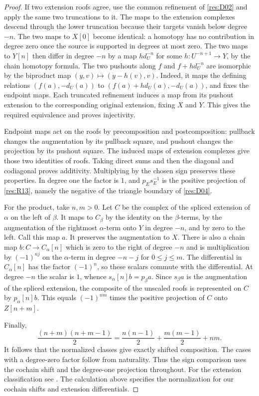\begin{proof}
If two extension roofs agree, use the common refinement of
\ref{res:D02} and apply the same two truncations to it.
The maps to the extension complexes descend through the lower
truncation because their targets vanish below degree \(-n\).
The two maps to \(X[0]\) become identical: a homotopy has no contribution
in degree zero once the source is supported in degrees at most
zero. The two maps to \(Y[n]\) then differ in degree \(-n\) by a
map \(h d_U^{-n}\) for some \(h:U^{-n+1}\to Y\), by the chain
homotopy formula. The two pushouts along \(f\) and \(f+h d_U^{-n}\)
are isomorphic by the biproduct map
\((y,v)\mapsto(y-h(v),v)\). Indeed, it maps the defining relations
\((f(a),-d_U(a))\) to \((f(a)+h d_U(a),-d_U(a))\), and fixes
the endpoint maps. Each truncated refinement induces a map
from its pushout extension to the corresponding original
extension, fixing \(X\) and \(Y\). This gives the required
equivalence and proves injectivity.

Endpoint maps act on the roofs by precomposition and postcomposition:
pullback changes the augmentation by its pullback square, and
pushout changes the projection by its pushout square. The induced
maps of extension complexes give those two identities of roofs.
Taking direct sums and then the diagonal and codiagonal proves
additivity. Multiplying by the chosen sign preserves these
properties. In degree one the factor is \(1\), and \(p_Es_E^{-1}\)
is the positive projection of \ref{res:R13}, namely the negative
of the triangle boundary of \ref{res:D04}.

For the product, take \(n,m>0\). Let \(C\) be the complex of the
spliced extension of \(\alpha\) on the left of \(\beta\).
It maps to \(C_\beta\) by the identity on the \(\beta\)-terms,
by the augmentation of the rightmost \(\alpha\)-term onto \(Y\)
in degree \(-n\), and by zero to the left. Call this map \(a\).
It preserves the augmentation to \(X\). There is also a chain
map \(b:C\to C_\alpha[n]\) which is zero to the right of
degree \(-n\) and is multiplication by \((-1)^{nj}\) on the
\(\alpha\)-term in degree \(-n-j\) for \(0\le j\le m\).
The differential in \(C_\alpha[n]\) has the factor \((-1)^n\),
so these scalars commute with the differential. At degree \(-n\)
the scalar is \(1\), whence \(s_\alpha[n]b=p_\beta a\).
Since \(s_\beta a\) is the augmentation of the spliced extension,
the composite of the unscaled roofs is represented on \(C\) by
\(p_\alpha[n]b\). This equals \((-1)^{nm}\) times the positive
projection of \(C\) onto \(Z[n+m]\).

Finally,
\[
 \frac{(n+m)(n+m-1)}{2}
       =\frac{n(n-1)}{2}+\frac{m(m-1)}{2}+nm .
\]
It follows that the normalized classes give exactly shifted
composition. The cases with a degree-zero factor follow from
naturality. Thus the sign comparison uses the cochain shift
and the degree-one projection throughout.
For the extension classification see
\cite[Tags 06XP, 06XT and 06XU]{stacks-derived}.
The calculation above specifies the normalization for our
cochain shifts and extension differentials.
\end{proof}

